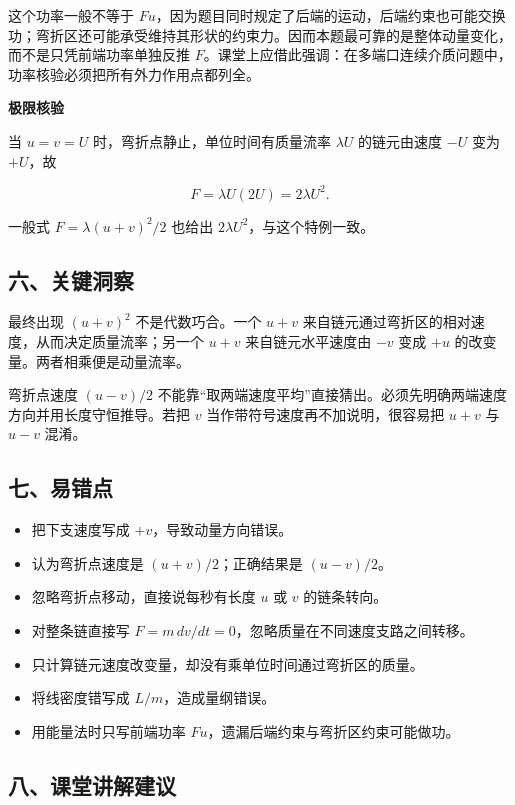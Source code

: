 \documentclass[12pt,a4paper,UTF8]{ctexart}
\newcommand{\tightlist}{\setlength{\itemsep}{0pt}\setlength{\parskip}{0pt}}
\begin{document}
这个功率一般不等于
\(Fu\)，因为题目同时规定了后端的运动，后端约束也可能交换功；弯折区还可能承受维持其形状的约束力。因而本题最可靠的是整体动量变化，而不是只凭前端功率单独反推
\(F\)。课堂上应借此强调：在多端口连续介质问题中，功率核验必须把所有外力作用点都列全。

\textbf{极限核验}

当 \(u=v=U\) 时，弯折点静止，单位时间有质量流率 \(\lambda U\)
的链元由速度 \(-U\) 变为 \(+U\)，故

\[F=\lambda U(2U)=2\lambda U^2.\]

一般式 \(F=\lambda(u+v)^2/2\) 也给出 \(2\lambda U^2\)，与这个特例一致。

\subsection{六、关键洞察}\label{ux516dux5173ux952eux6d1eux5bdf-1}

最终出现 \((u+v)^2\) 不是代数巧合。一个 \(u+v\)
来自链元通过弯折区的相对速度，从而决定质量流率；另一个 \(u+v\)
来自链元水平速度由 \(-v\) 变成 \(+u\) 的改变量。两者相乘便是动量流率。

弯折点速度 \((u-v)/2\)
不能靠``取两端速度平均''直接猜出。必须先明确两端速度方向并用长度守恒推导。若把
\(v\) 当作带符号速度再不加说明，很容易把 \(u+v\) 与 \(u-v\) 混淆。

\subsection{七、易错点}\label{ux4e03ux6613ux9519ux70b9-1}

\begin{itemize}
\tightlist
\item
  把下支速度写成 \(+v\)，导致动量方向错误。
\item
  认为弯折点速度是 \((u+v)/2\)；正确结果是 \((u-v)/2\)。
\item
  忽略弯折点移动，直接说每秒有长度 \(u\) 或 \(v\) 的链条转向。
\item
  对整条链直接写 \(F=m\,dv/dt=0\)，忽略质量在不同速度支路之间转移。
\item
  只计算链元速度改变量，却没有乘单位时间通过弯折区的质量。
\item
  将线密度错写成 \(L/m\)，造成量纲错误。
\item
  用能量法时只写前端功率 \(Fu\)，遗漏后端约束与弯折区约束可能做功。
\end{itemize}

\subsection{八、课堂讲解建议}\label{ux516bux8bfeux5802ux8bb2ux89e3ux5efaux8bae-1}
\end{document}
